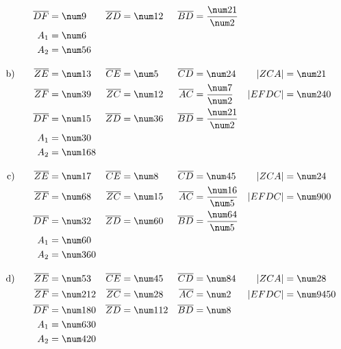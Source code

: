 \begin{exercise}
\begin{align*}
                       \overline{DF}&=\aDF   & \overline{ZD}&=\aZD & \overline{BD}&=\aBD &       &        \\
                                 A_1&=\aZEC  &              &      &              &      &       &        \\
                                 A_2&=\aCDBA &              &      &              &      &       &        \\[2ex]
        \text{b)}\qquad\overline{ZE}&=\bZE   & \overline{CE}&=\bCE & \overline{CD}&=\bCD &  |ZCA|&=\bZCA  \\
                       \overline{ZF}&=\bZF   & \overline{ZC}&=\bZC & \overline{AC}&=\bAC & |EFDC|&=\bEFDC \\
                       \overline{DF}&=\bDF   & \overline{ZD}&=\bZD & \overline{BD}&=\bBD &       &        \\
                                 A_1&=\bZEC  &              &      &              &      &       &        \\
                                 A_2&=\bCDBA &              &      &              &      &       &        \\[2ex]
        \text{c)}\qquad\overline{ZE}&=\cZE   & \overline{CE}&=\cCE & \overline{CD}&=\cCD &  |ZCA|&=\cZCA  \\
                       \overline{ZF}&=\cZF   & \overline{ZC}&=\cZC & \overline{AC}&=\cAC & |EFDC|&=\cEFDC \\
                       \overline{DF}&=\cDF   & \overline{ZD}&=\cZD & \overline{BD}&=\cBD &       &        \\
                                 A_1&=\cZEC  &              &      &              &      &       &        \\
                                 A_2&=\cCDBA &              &      &              &      &       &        \\[2ex]
        \text{d)}\qquad\overline{ZE}&=\dZE   & \overline{CE}&=\dCE & \overline{CD}&=\dCD &  |ZCA|&=\dZCA  \\
                       \overline{ZF}&=\dZF   & \overline{ZC}&=\dZC & \overline{AC}&=\dAC & |EFDC|&=\dEFDC \\
                       \overline{DF}&=\dDF   & \overline{ZD}&=\dZD & \overline{BD}&=\dBD &       &        \\
                                 A_1&=\dZEC  &              &      &              &      &       &        \\
                                 A_2&=\dCDBA &              &      &              &      &       &        \\[2ex]
      \end{align*}
    \endgroup
  \fi
\end{exercise}
